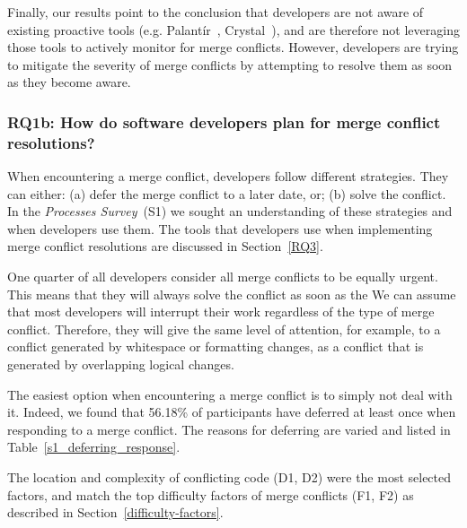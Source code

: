 Finally, our results point to the conclusion that developers are not aware of existing proactive tools (e.g. Palant\'{i}r~\cite{sarma_palantir:_2003}, Crystal~\cite{Brun2011}), and are therefore not leveraging those tools to actively monitor for merge conflicts.
However, developers are trying to mitigate the severity of merge conflicts by attempting to resolve them as soon as they become aware.

\subsubsection{\textbf{RQ1b:} How do software developers \textbf{plan} for merge conflict resolutions?}\label{RQ1b}

When encountering a merge conflict, developers follow different strategies.
They can either: (a) defer the merge conflict to a later date, or; (b) solve the conflict.
In the \textit{Processes Survey}~(S1) we sought an understanding of these strategies and when developers use them.
The tools that developers use when implementing merge conflict resolutions are discussed in Section~\ref{RQ3}.


One quarter of all developers consider all merge conflicts to be equally urgent.
This means that they will always solve the conflict as soon as the 
We can assume that most developers will interrupt their work regardless of the type of merge conflict.
Therefore, they will give the same level of attention, for example, to a conflict generated by whitespace or formatting changes, as a conflict that is generated by overlapping logical changes. 

The easiest option when encountering a merge conflict is to simply not deal with it.
Indeed, we found that 56.18\% of participants have deferred at least once when responding to a merge conflict.
The reasons for deferring are varied and listed in Table~\ref{s1_deferring_response}.

The location and complexity of conflicting code (D1, D2) were the most selected factors, and match the top difficulty factors of merge conflicts (F1, F2) as described in Section~\ref{difficulty-factors}.

